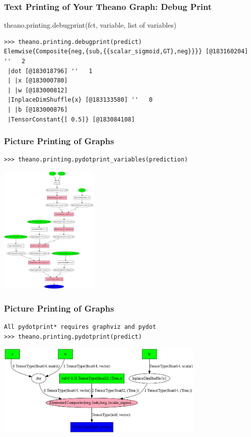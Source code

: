 \documentclass[a4paper,9pt]{beamer}
\begin{document}
\begin{frame}[fragile]
\frametitle{Text Printing of Your Theano Graph: Debug Print}
theano.printing.debugprint({fct, variable, list of variables})
\vfill
\small
\begin{Verbatim}
>>> theano.printing.debugprint(predict)
Elemwise{Composite{neg,{sub,{{scalar_sigmoid,GT},neg}}}} [@183160204] ''   2
 |dot [@183018796] ''   1
 | |x [@183000780]
 | |w [@183000812]
 |InplaceDimShuffle{x} [@183133580] ''   0
 | |b [@183000876]
 |TensorConstant{[ 0.5]} [@183084108]
\end{Verbatim}
\end{frame}

\begin{frame}[fragile]
\frametitle{Picture Printing of Graphs}
\begin{Verbatim}
>>> theano.printing.pydotprint_variables(prediction)
\end{Verbatim}
\includegraphics[width=1.9in]{pics/logreg_pydotprint_prediction.png}
\end{frame}

\begin{frame}[fragile]
\frametitle{Picture Printing of Graphs}
\begin{Verbatim}
All pydotprint* requires graphviz and pydot
>>> theano.printing.pydotprint(predict)
\end{Verbatim}
\includegraphics[width=4in]{pics/logreg_pydotprint_predic.png}
\end{frame}
\end{document}
